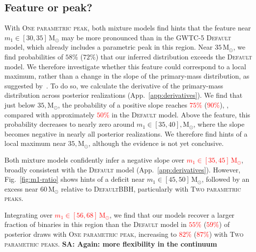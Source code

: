 \documentclass[twocolumn,twocolappendix,linenumbers]{aastex631}
\newcommand{\sa}[1]{{\bf\color{Thistle}SA: #1}}
\newcommand{\oneparpeak}{\textsc{One parametric peak}\xspace}
\newcommand{\twoparpeaks}{\textsc{Two parametric peaks}\xspace}
\newcommand{\Default}{\textsc{Default}\xspace}
\newcommand{\Msun}{\ensuremath{\mathrm{M}_\odot}\xspace}
\begin{document}
\subsection{Feature or peak?}\label{subsec:peak-or-feature}

With \oneparpeak, both mixture models find hints that the feature near $m_1 \in [30,35]\,\Msun$ may be more pronounced than in the \ac{GWTC-5} \textsc{Default} model, which already includes a parametric peak in this region.
Near $35\,\Msun$, we find probabilities of $58\%$ ($72\%$) that our inferred distribution exceeds the \textsc{Default} model.
We therefore investigate whether this feature could correspond to a local maximum, rather than a change in the slope of the primary-mass distribution, as suggested by~\cite{LIGOScientific:2026ctl}.
To do so, we calculate the derivative of the primary-mass distribution across posterior realizations (App.~\ref{app:derivatives}).
We find that just below $35,\Msun$, the probability of a positive slope reaches \textcolor{red}{$75\%$} (\textcolor{red}{$90\%$}), , compared with approximately \textcolor{red}{$50\%$} in the \textsc{Default} model.
Above the feature, this probability decreases to nearly zero around $m_1\in[35,40],\Msun$, where the slope becomes negative in nearly all posterior realizations.
We therefore find hints of a local maximum near $35,\Msun$, although the evidence is not yet conclusive.


Both mixture models confidently infer a negative slope over \textcolor{red}{$m_1 \in [35,45]\,\Msun$}, broadly consistent with the \textsc{Default} model (App.~\ref{app:derivatives}).
However, Fig.~\ref{fig:m1-ratio} shows hints of a deficit near $m_1 \in [45,50]\,\Msun$, followed by an excess near $60\,\Msun$ relative to \Default \ac{BBH}, particularly with \twoparpeaks.

Integrating over \textcolor{red}{$m_1 \in [56,68]\,\Msun$}, we find that our models recover a larger fraction of binaries in this region than the \textsc{Default} model in \textcolor{red}{$55\%$} (\textcolor{red}{$59\%$}) of posterior draws with \oneparpeak, increasing to \textcolor{red}{$82\%$} (\textcolor{red}{$87\%$}) with \twoparpeaks. \sa{Again: more flexibility in the continuum}
\end{document}
